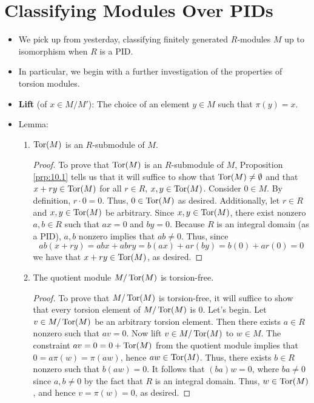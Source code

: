 \documentclass[../notes.tex]{subfiles}
\begin{document}
\section{Classifying Modules Over PIDs}
\begin{itemize}
    \item {}We pick up from yesterday, classifying finitely generated $R$-modules $M$ up to isomorphism when $R$ is a PID.
    \item In particular, we begin with a further investigation of the properties of torsion modules.
    \item \textbf{Lift} (of $x\in M/M'$): The choice of an element $y\in M$ such that $\pi(y)=x$.
    \item Lemma:
    \begin{enumerate}[label={(\roman*)}]
        \item $\operatorname{Tor}(M)$ is an $R$-submodule of $M$.
        \begin{proof}
            To prove that $\operatorname{Tor}(M)$ is an $R$-submodule of $M$, Proposition \ref{prp:10.1} tells us that it will suffice to show that $\operatorname{Tor}(M)\neq\emptyset$ and that $x+ry\in\operatorname{Tor}(M)$ for all $r\in R$, $x,y\in\operatorname{Tor}(M)$. Consider $0\in M$. By definition, $r\cdot 0=0$. Thus, $0\in\operatorname{Tor}(M)$ as desired. Additionally, let $r\in R$ and $x,y\in\operatorname{Tor}(M)$ be arbitrary. Since $x,y\in\operatorname{Tor}(M)$, there exist nonzero $a,b\in R$ such that $ax=0$ and $by=0$. Because $R$ is an integral domain (as a PID), $a,b$ nonzero implies that $ab\neq 0$. Thus, since
            \begin{equation*}
                ab(x+ry) = abx+abry
                = b(ax)+ar(by)
                = b(0)+ar(0)
                = 0
            \end{equation*}
            we have that $x+ry\in\operatorname{Tor}(M)$, as desired.
        \end{proof}
        \item The quotient module $M/\operatorname{Tor}(M)$ is torsion-free.
        \begin{proof}
            To prove that $M/\operatorname{Tor}(M)$ is torsion-free, it will suffice to show that every torsion element of $M/\operatorname{Tor}(M)$ is 0. Let's begin. Let $v\in M/\operatorname{Tor}(M)$ be an arbitrary torsion element. Then there exists $a\in R$ nonzero such that $av=0$. Now lift $v\in M/\operatorname{Tor}(M)$ to $w\in M$. The constraint $av=0=0+\operatorname{Tor}(M)$ from the quotient module implies that $0=a\pi(w)=\pi(aw)$, hence $aw\in\operatorname{Tor}(M)$. Thus, there exists $b\in R$ nonzero such that $b(aw)=0$. It follows that $(ba)w=0$, where $ba\neq 0$ since $a,b\neq 0$ by the fact that $R$ is an integral domain. Thus, $w\in\operatorname{Tor}(M)$, and hence $v=\pi(w)=0$, as desired.

\end{proof}
\end{enumerate}
\end{itemize}
\end{document}
